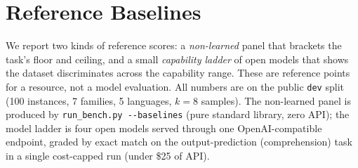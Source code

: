 
\section{Reference Baselines}
\label{sec:baselines}

We report two kinds of reference scores: a \emph{non-learned} panel that brackets the
task's floor and ceiling, and a small \emph{capability ladder} of open models that shows
the dataset discriminates across the capability range. These are reference points for a
resource, not a model evaluation. All numbers are on the public \texttt{dev} split (100
instances, 7 families, 5 languages, $k{=}8$ samples). The non-learned panel is produced by
\texttt{run\_bench.py -{}-baselines} (pure standard library, zero API); the model ladder is
four open models served through one OpenAI-compatible endpoint, graded by exact match on
the output-prediction (comprehension) task in a single cost-capped run (under \$25 of
API).

